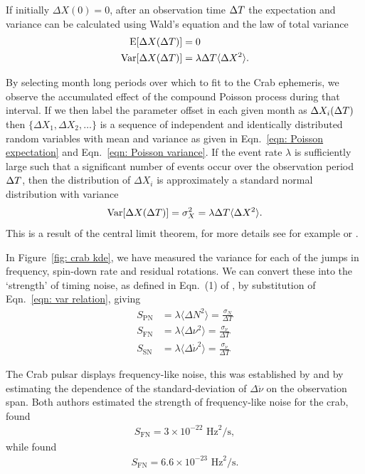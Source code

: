 \documentclass[../full_thesis/full_thesis.tex]{subfiles}
\begin{document}
\begin{subappendices}
If initially $\Delta X(0)=0$, after an observation time $\Delta T$  the
expectation and variance can be calculated using Wald's equation \citep{wald1944cumulative}
and the law of total variance \citep{weiss2006course}
\begin{align}
\textrm{E}[\Delta X(\Delta T)] & = 0
\label{eqn: Poisson expectation} \\
\textrm{Var}[\Delta X(\Delta T)] &  = \lambda \Delta T \langle\Delta X^{2}\rangle.
\label{eqn: Poisson variance}
\end{align}

By selecting month long periods over which to fit to the Crab ephemeris, we
observe the accumulated effect of the compound Poisson process during that
interval. If we then label the parameter offset in each given month as $\Delta
X_{i}(\Delta T)$ then $\{\Delta X_{1}, \Delta X_{2}, \dots\}$ is a sequence of
independent and identically distributed random variables with mean and variance
as given in Eqn.~\eqref{eqn: Poisson expectation} and Eqn.~\eqref{eqn: Poisson
variance}. If the event rate $\lambda$ is sufficiently large such that a
significant number of events occur over the observation period $\Delta T$, then the
distribution of $\Delta X_{i}$ is approximately a standard normal distribution
with variance 
\begin{align}
\textrm{Var}[\Delta X(\Delta T)] =\sigma_{X}^{2} = \lambda \Delta T \langle\Delta X^{2}\rangle .
\label{eqn: var relation}
\end{align}
This is a result of the central limit theorem, for more details see for
example \citet{Feller1968} or \citet{weiss2006course}.

In Figure~\ref{fig: crab kde}, we have measured the variance for each of the
jumps in frequency, spin-down rate and residual rotations. We can convert these
into the `strength' of timing noise, as defined in Eqn.~(1) of \citet{Cordes1981},
by substitution of Eqn.~\eqref{eqn: var relation}, giving
\begin{align}
S_{\mathrm{PN}} & = \lambda \langle \Delta N^{2} \rangle = \frac{\sigma_N}{\Delta T} \\
S_{\mathrm{FN}} & = \lambda \langle \Delta \nu^{2} \rangle = \frac{\sigma_\nu}{\Delta T}
\label{eqn: SFN} \\
S_{\mathrm{SN}} & = \lambda \langle \Delta \dot{\nu}^{2} \rangle = 
\frac{\sigma_{\dot{\nu}}}{\Delta T}
\end{align}

The Crab pulsar displays frequency-like noise, this was established by
\citet{Boynton1972} and \citet{Cordes1981} by estimating the dependence of
the standard-deviation of $\Delta \ddot{\nu}$ on the observation span. Both
authors estimated the strength of frequency-like noise for the crab,
\citet{Boynton1972} found
\begin{align}
S_{\mathrm{FN}} = 3 \times 10^{-22} \textrm{ Hz}^{2}/\textrm{s},
\end{align}
while \citet{Cordes1981} found
\begin{align}
S_{\mathrm{FN}} = 6.6 \times 10^{-23} \textrm{ Hz}^{2}/\textrm{s}.
\end{align}


\end{subappendices}
\end{document}
